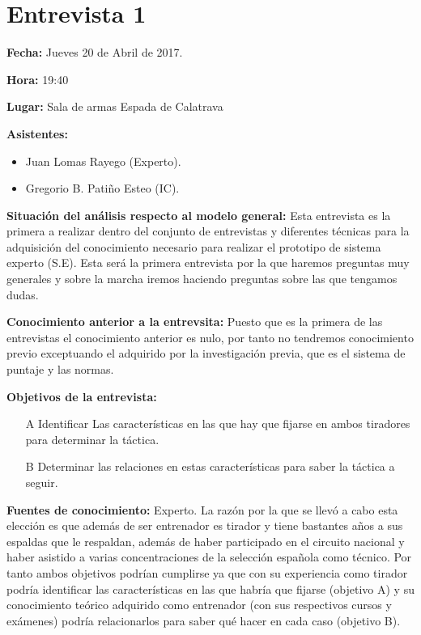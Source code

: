 \section{Entrevista 1}

\textbf{Fecha:} Jueves 20 de Abril de 2017.

\textbf{Hora:} 19:40

\textbf{Lugar:} Sala de armas Espada de Calatrava

\textbf{Asistentes:}
  \begin{itemize}
    \item Juan Lomas Rayego (Experto).
    \item Gregorio B. Patiño Esteo (IC).
  \end{itemize}

\textbf{Situación del análisis respecto al modelo general:} Esta entrevista es la primera a realizar dentro del conjunto de entrevistas y diferentes técnicas
 para la adquisición del conocimiento necesario para realizar el prototipo de sistema experto
 (S.E). Esta será la primera entrevista por la que haremos preguntas muy generales y sobre la
 marcha iremos haciendo preguntas sobre las que tengamos dudas.

\textbf{Conocimiento anterior a la entrevsita:} Puesto que es la primera de las entrevistas el conocimiento anterior es nulo, por tanto no
tendremos conocimiento previo exceptuando el adquirido por la investigación previa, que es el
sistema de puntaje y las normas.

\textbf{Objetivos de la entrevista:}
\begin{itemize}
  \item[A] Identificar Las características en las que hay que fijarse
    en ambos tiradores para determinar la táctica.
  \item[B] Determinar las relaciones en estas características para saber la táctica a seguir.
\end{itemize}



\textbf{Fuentes de conocimiento:} Experto.
La razón por la que se llevó a cabo esta elección es que además de ser entrenador es tirador y
tiene bastantes años a sus espaldas que le respaldan, además de haber participado en el circuito
nacional y haber asistido a varias concentraciones de la selección española como técnico. Por
tanto ambos objetivos podrían cumplirse ya que con su experiencia como tirador podría
identificar las características en las que habría que fijarse (objetivo A) y su conocimiento teórico
adquirido como entrenador (con sus respectivos cursos y exámenes) podría relacionarlos para
saber qué hacer en cada caso (objetivo B).

